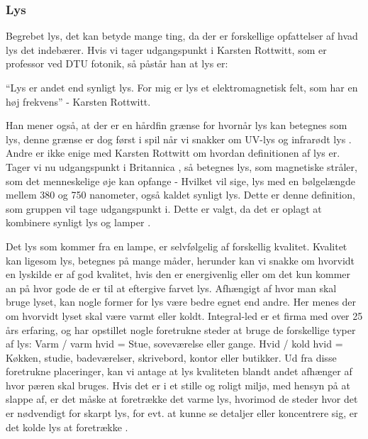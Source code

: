 \subsubsection{Lys}
Begrebet lys, det kan betyde mange ting, da der er forskellige opfattelser af hvad lys det indebærer. Hvis vi tager udgangspunkt i Karsten Rottwitt, som er professor ved DTU fotonik, så påstår han at lys er:

“Lys er andet end synligt lys. For mig er lys et elektromagnetisk felt, som har en høj frekvens”
- Karsten Rottwitt.

Han mener også, at der er en hårdfin grænse for hvornår lys kan betegnes som lys, denne grænse er dog først i spil når vi snakker om UV-lys og infrarødt lys \cite{def_lys}. 
Andre er ikke enige med Karsten Rottwitt om hvordan definitionen af lys er. Tager vi nu udgangspunkt i Britannica \cite{britannica_lys}, så betegnes lys, som magnetiske stråler, som det menneskelige øje kan opfange - Hvilket vil sige, lys med en bølgelængde mellem 380 og 750 nanometer, også kaldet synligt lys. 
Dette er denne definition, som gruppen vil tage udgangspunkt i. Dette er valgt, da det er oplagt at kombinere synligt lys og lamper \cite{def_lys}.


Det lys som kommer fra en lampe, er selvfølgelig af forskellig kvalitet. Kvalitet kan ligesom lys, betegnes på mange måder, herunder kan vi snakke om hvorvidt en lyskilde er af god kvalitet, hvis den er energivenlig eller om det kun kommer an på hvor gode de er til at eftergive farvet lys. 
Afhængigt af hvor man skal bruge lyset, kan nogle former for lys være bedre egnet end andre. Her menes der om hvorvidt lyset skal være varmt eller koldt. Integral-led er et firma med over 25 års erfaring, og har opstillet nogle foretrukne steder at bruge de forskellige typer af lys:
Varm / varm hvid = Stue, soveværelse eller gange.
Hvid / kold hvid = Køkken, studie, badeværelser, skrivebord, kontor eller butikker. 
Ud fra disse foretrukne placeringer, kan vi antage at lys kvaliteten blandt andet afhænger af hvor pæren skal bruges. Hvis det er i et stille og roligt miljø, med hensyn på at slappe af, er det måske at foretrække det varme lys, hvorimod de steder hvor det er nødvendigt for skarpt lys, for evt. at kunne se detaljer eller koncentrere sig, er det kolde lys at foretrække \cite{varm_kold}.

